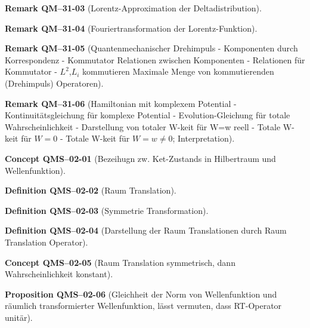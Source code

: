 \documentclass[10pt, letterpaper]{article}
\newcommand{\CustomHeading}[3]{%
  \par\medskip\noindent%
  \textbf{#1 #2} \textnormal{(#3)}.\enskip%
}
\newenvironment{DEF}[2]{\CustomHeading{Definition}{#1}{#2}}{}
\newenvironment{PROP}[2]{\CustomHeading{Proposition}{#1}{#2}}{}
\newenvironment{REM}[2]{\CustomHeading{Remark}{#1}{#2}}{}
\newenvironment{CONC}[2]{\CustomHeading{Concept}{#1}{#2}}{}
\begin{document}
\begin{REM}{QM--31-03}{Lorentz-Approximation der Deltadistribution}
\end{REM}

\begin{REM}{QM--31-04}{Fouriertransformation der Lorentz-Funktion}
\end{REM}

\begin{REM}{QM--31-05}{Quantenmechanischer Drehimpuls
- Komponenten durch Korrespondenz
- Kommutator Relationen zwischen Komponenten
- Relationen für Kommutator
- $L^2$,$L_i$ kommutieren
Maximale Menge von kommutierenden (Drehimpuls) Operatoren}
\end{REM}

\begin{REM}{QM--31-06}{Hamiltonian mit komplexem Potential
- Kontinuitätsgleichung für komplexe Potential
- Evolution-Gleichung für totale Wahrscheinlichkeit
- Darstellung von totaler W-keit für W=w reell
- Totale W-keit für $W=0$
- Totale W-keit für $W=w\neq 0$; Interpretation}
\end{REM}

\begin{CONC}{QMS--02-01}{Bezeihugn zw. Ket-Zustands in Hilbertraum und Wellenfunktion}
\end{CONC}

\begin{DEF}{QMS--02-02}{Raum Translation}
\end{DEF}

\begin{DEF}{QMS--02-03}{Symmetrie Transformation}
\end{DEF}

\begin{DEF}{QMS--02-04}{Darstellung der Raum Translationen durch Raum Translation Operator}
\end{DEF}

\begin{CONC}{QMS--02-05}{Raum Translation symmetrisch, dann Wahrscheinlichkeit konstant}
\end{CONC}

\begin{PROP}{QMS--02-06}{Gleichheit der Norm von Wellenfunktion und räumlich transformierter Wellenfunktion, lässt vermuten, dass RT-Operator unitär}
\end{PROP}
\end{document}

